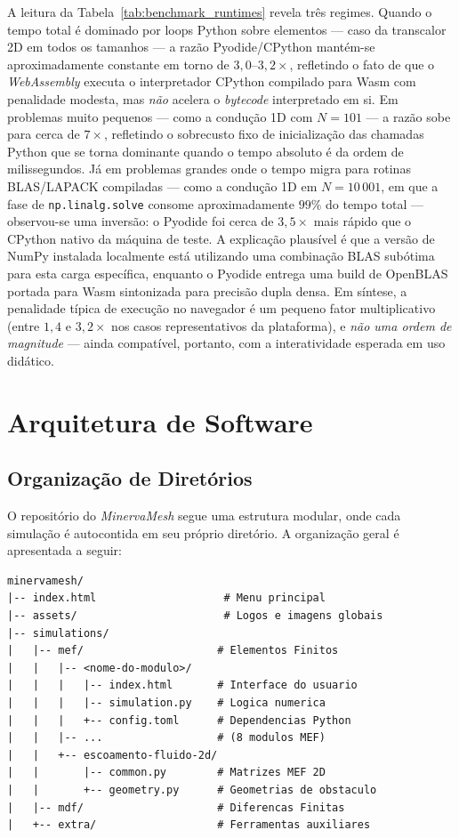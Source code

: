 A leitura da Tabela~\ref{tab:benchmark_runtimes} revela três regimes. Quando o tempo total é dominado por loops Python sobre elementos --- caso da transcalor 2D em todos os tamanhos --- a razão Pyodide/CPython mantém-se aproximadamente constante em torno de $3{,}0\text{--}3{,}2\times$, refletindo o fato de que o \textit{WebAssembly} executa o interpretador CPython compilado para Wasm com penalidade modesta, mas \emph{não} acelera o \textit{bytecode} interpretado em si. Em problemas muito pequenos --- como a condução 1D com $N = 101$ --- a razão sobe para cerca de $7\times$, refletindo o sobrecusto fixo de inicialização das chamadas Python que se torna dominante quando o tempo absoluto é da ordem de milissegundos. Já em problemas grandes onde o tempo migra para rotinas BLAS/LAPACK compiladas --- como a condução 1D em $N = 10\,001$, em que a fase de \texttt{np.linalg.solve} consome aproximadamente $99\%$ do tempo total --- observou-se uma inversão: o Pyodide foi cerca de $3{,}5\times$ mais rápido que o CPython nativo da máquina de teste. A explicação plausível é que a versão de NumPy instalada localmente está utilizando uma combinação BLAS subótima para esta carga específica, enquanto o Pyodide entrega uma build de OpenBLAS portada para Wasm sintonizada para precisão dupla densa. Em síntese, a penalidade típica de execução no navegador é um pequeno fator multiplicativo (entre $1{,}4$ e $3{,}2\times$ nos casos representativos da plataforma), e \emph{não uma ordem de magnitude} --- ainda compatível, portanto, com a interatividade esperada em uso didático.

\section{Arquitetura de Software}
\label{sec:arquitetura_software}

\subsection{Organização de Diretórios}
\label{sec:organizacao_diretorios}

O repositório do \textit{MinervaMesh} segue uma estrutura modular, onde cada simulação é autocontida em seu próprio diretório. A organização geral é apresentada a seguir:

\begin{lstlisting}[style=dirstyle,numbers=none]
minervamesh/
|-- index.html                    # Menu principal
|-- assets/                       # Logos e imagens globais
|-- simulations/
|   |-- mef/                     # Elementos Finitos
|   |   |-- <nome-do-modulo>/
|   |   |   |-- index.html       # Interface do usuario
|   |   |   |-- simulation.py    # Logica numerica
|   |   |   +-- config.toml      # Dependencias Python
|   |   |-- ...                  # (8 modulos MEF)
|   |   +-- escoamento-fluido-2d/
|   |       |-- common.py        # Matrizes MEF 2D
|   |       +-- geometry.py      # Geometrias de obstaculo
|   |-- mdf/                     # Diferencas Finitas
|   +-- extra/                   # Ferramentas auxiliares
\end{lstlisting}

